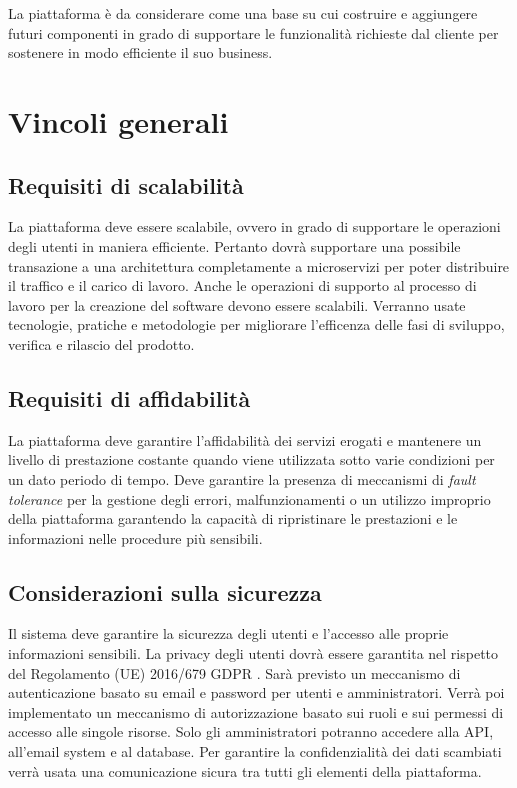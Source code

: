La piattaforma è da considerare come una base su cui costruire e aggiungere futuri componenti in grado di supportare le funzionalità richieste dal cliente per sostenere
in modo efficiente il suo business.


\section{Vincoli generali}
\subsection{Requisiti di scalabilità}
La piattaforma deve essere scalabile, ovvero in grado di supportare le operazioni degli utenti
in maniera efficiente.
Pertanto dovrà supportare una possibile transazione a una architettura completamente a microservizi per poter distribuire il traffico e
il carico di lavoro.
Anche le operazioni di supporto al processo di lavoro per la creazione del software devono essere scalabili.
Verranno usate tecnologie, pratiche e metodologie per migliorare l'efficenza delle fasi di sviluppo, verifica e rilascio del prodotto.

\subsection{Requisiti di affidabilità}
La piattaforma deve garantire l'affidabilità dei servizi erogati e mantenere un livello di prestazione
costante quando viene utilizzata sotto varie condizioni per un dato periodo di tempo.
Deve garantire la presenza di meccanismi di \textit{fault tolerance} per la gestione degli errori, malfunzionamenti o un utilizzo improprio della piattaforma
garantendo la capacità di ripristinare le prestazioni e le informazioni nelle procedure più sensibili.

\subsection{Considerazioni sulla sicurezza}
Il sistema deve garantire la sicurezza degli utenti e l’accesso alle proprie informazioni sensibili.
La privacy degli utenti dovrà essere garantita nel rispetto del Regolamento (UE) 2016/679 GDPR \cite{gdpr}.
Sarà previsto un meccanismo di autenticazione basato su email e password per utenti e amministratori.
Verrà poi implementato un meccanismo di autorizzazione basato sui ruoli e sui permessi di accesso alle singole risorse.
Solo gli amministratori potranno accedere alla API, all’email system e al database.
Per garantire la confidenzialità dei dati scambiati verrà usata una comunicazione sicura tra tutti gli elementi della piattaforma.

